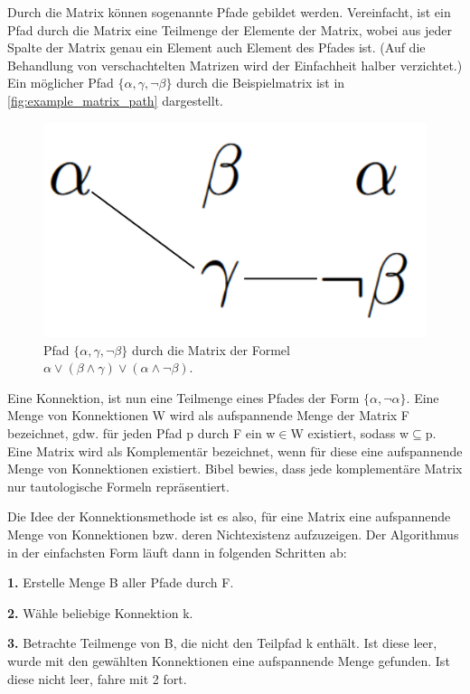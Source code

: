 Durch die Matrix können sogenannte Pfade gebildet werden. Vereinfacht, ist ein Pfad durch die Matrix eine Teilmenge der Elemente der Matrix, wobei aus jeder Spalte der Matrix genau ein Element auch Element des Pfades ist. (Auf die Behandlung von verschachtelten Matrizen wird der Einfachheit halber verzichtet.) Ein möglicher Pfad $\lbrace\alpha,\gamma,\neg\beta\rbrace$ durch die Beispielmatrix ist in \autoref{fig:example_matrix_path} dargestellt.

\begin{figure}[H]
\begin{center}
\includegraphics[scale=0.5]{images/example_matrix_path.png}
\caption{Pfad $\lbrace\alpha,\gamma,\neg\beta\rbrace$ durch die Matrix der Formel $\alpha\vee(\beta\wedge\gamma)\vee(\alpha\wedge\neg\beta)$.}
\label{fig:example_matrix_path}
\end{center}
\end{figure}

Eine Konnektion, ist nun eine Teilmenge eines Pfades der Form $\lbrace\alpha,\neg\alpha\rbrace$. Eine Menge von Konnektionen W wird als aufspannende Menge der Matrix F bezeichnet, gdw. für jeden Pfad p durch F ein w$\in$W existiert, sodass w$\subseteq$p. Eine Matrix wird als Komplementär bezeichnet, wenn für diese eine aufspannende Menge von Konnektionen existiert. Bibel bewies, dass jede komplementäre Matrix nur tautologische Formeln repräsentiert. \cite{atp_bibel}

Die Idee der Konnektionsmethode ist es also, für eine Matrix eine aufspannende Menge von Konnektionen bzw. deren Nichtexistenz aufzuzeigen. Der Algorithmus in der einfachsten Form läuft dann in folgenden Schritten ab:

\begin{description}

\item \textbf{1.} Erstelle Menge B aller Pfade durch F.

\item \textbf{2.} Wähle beliebige Konnektion k.

\item \textbf{3.} Betrachte Teilmenge von B, die nicht den Teilpfad k enthält. Ist diese leer, wurde mit den gewählten Konnektionen eine aufspannende Menge gefunden. Ist diese nicht leer, fahre mit 2 fort.

\end{description}

